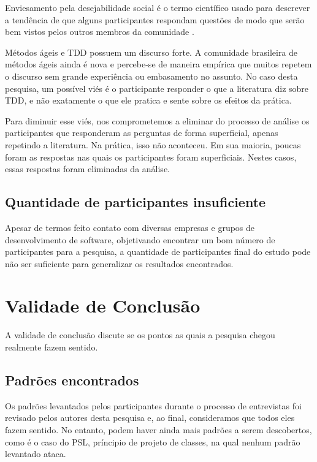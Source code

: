 Enviesamento pela desejabilidade social é o termo científico usado para descrever
a tendência de que alguns participantes respondam questões de modo que serão
bem vistos pelos outros membros da comunidade \cite{crowne}.

Métodos ágeis e TDD possuem um discurso forte. A comunidade brasileira de métodos
ágeis ainda é nova e percebe-se de maneira empírica que muitos repetem o discurso
sem grande experiência ou embasamento no assunto.
No caso desta pesquisa, um possível viés é o participante responder o que
a literatura diz sobre TDD, e não exatamente o que ele pratica e sente sobre
os efeitos da prática. 

Para diminuir esse viés, nos comprometemos a eliminar do processo de análise os participantes
que responderam as perguntas de forma superficial, apenas repetindo a literatura. Na prática,
isso não aconteceu. Em sua maioria, poucas foram as respostas nas quais os participantes
foram superficiais. Nestes casos, essas respostas foram eliminadas da análise.

\subsection{Quantidade de participantes insuficiente}

Apesar de termos feito contato
com diversas empresas e grupos de desenvolvimento de software,
objetivando encontrar um bom número de participantes para a pesquisa,
a quantidade de participantes final do estudo pode não ser suficiente para generalizar
os resultados encontrados. 

\section{Validade de Conclusão}

A validade de conclusão discute se os pontos as quais a pesquisa chegou realmente
fazem sentido.

\subsection{Padrões encontrados}

Os padrões levantados pelos participantes durante o processo de entrevistas
foi revisado pelos autores desta pesquisa e, ao final, consideramos que todos
eles fazem sentido.
No entanto, podem haver ainda mais padrões a serem descobertos, como é o caso
do PSL, príncipio de projeto de classes, na qual nenhum padrão levantado
ataca.

